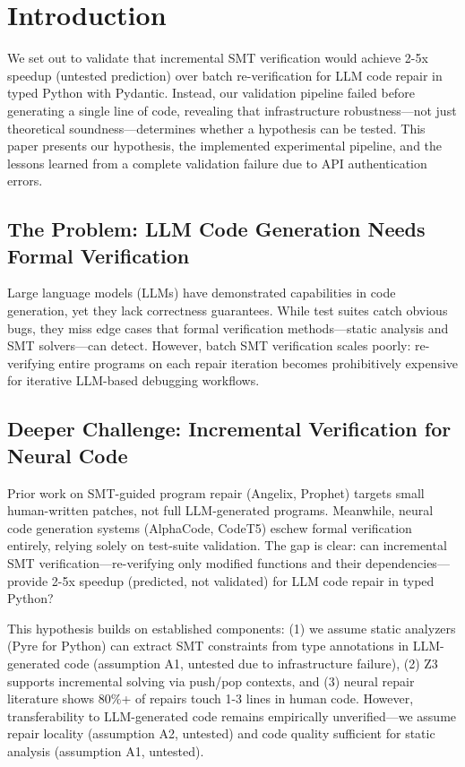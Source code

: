 \section{Introduction}

We set out to validate that incremental SMT verification would achieve 2-5x speedup (untested prediction) over batch re-verification for LLM code repair in typed Python with Pydantic. Instead, our validation pipeline failed before generating a single line of code, revealing that infrastructure robustness---not just theoretical soundness---determines whether a hypothesis can be tested. This paper presents our hypothesis, the implemented experimental pipeline, and the lessons learned from a complete validation failure due to API authentication errors.

\subsection{The Problem: LLM Code Generation Needs Formal Verification}

Large language models (LLMs) have demonstrated capabilities in code generation, yet they lack correctness guarantees. While test suites catch obvious bugs, they miss edge cases that formal verification methods---static analysis and SMT solvers---can detect. However, batch SMT verification scales poorly: re-verifying entire programs on each repair iteration becomes prohibitively expensive for iterative LLM-based debugging workflows.

\subsection{Deeper Challenge: Incremental Verification for Neural Code}

Prior work on SMT-guided program repair (Angelix, Prophet) targets small human-written patches, not full LLM-generated programs. Meanwhile, neural code generation systems (AlphaCode, CodeT5) eschew formal verification entirely, relying solely on test-suite validation. The gap is clear: can incremental SMT verification---re-verifying only modified functions and their dependencies---provide 2-5x speedup (predicted, not validated) for LLM code repair in typed Python?

This hypothesis builds on established components: (1) we assume static analyzers (Pyre for Python) can extract SMT constraints from type annotations in LLM-generated code (assumption A1, untested due to infrastructure failure), (2) Z3 supports incremental solving via push/pop contexts, and (3) neural repair literature shows 80\%+ of repairs touch 1-3 lines in human code. However, transferability to LLM-generated code remains empirically unverified---we assume repair locality (assumption A2, untested) and code quality sufficient for static analysis (assumption A1, untested).

